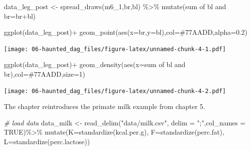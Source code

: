 \documentclass[
]{book}
\newenvironment{Shaded}{\begin{snugshade}}{\end{snugshade}}
\newcommand{\AttributeTok}[1]{\textcolor[rgb]{0.77,0.63,0.00}{#1}}
\newcommand{\CommentTok}[1]{\textcolor[rgb]{0.56,0.35,0.01}{\textit{#1}}}
\newcommand{\ConstantTok}[1]{\textcolor[rgb]{0.00,0.00,0.00}{#1}}
\newcommand{\DecValTok}[1]{\textcolor[rgb]{0.00,0.00,0.81}{#1}}
\newcommand{\FloatTok}[1]{\textcolor[rgb]{0.00,0.00,0.81}{#1}}
\newcommand{\FunctionTok}[1]{\textcolor[rgb]{0.00,0.00,0.00}{#1}}
\newcommand{\NormalTok}[1]{#1}
\newcommand{\OtherTok}[1]{\textcolor[rgb]{0.56,0.35,0.01}{#1}}
\newcommand{\SpecialCharTok}[1]{\textcolor[rgb]{0.00,0.00,0.00}{#1}}
\newcommand{\StringTok}[1]{\textcolor[rgb]{0.31,0.60,0.02}{#1}}
\begin{document}
\begin{Shaded}
\begin{Highlighting}[]
\NormalTok{data\_leg\_post }\OtherTok{\textless{}{-}} \FunctionTok{spread\_draws}\NormalTok{(m6\_1,br,bl) }\SpecialCharTok{\%\textgreater{}\%}
  \FunctionTok{mutate}\NormalTok{(}\StringTok{\textasciigrave{}}\AttributeTok{sum of bl and br}\StringTok{\textasciigrave{}}\OtherTok{=}\NormalTok{br}\SpecialCharTok{+}\NormalTok{bl)}

\FunctionTok{ggplot}\NormalTok{(data\_leg\_post)}\SpecialCharTok{+}
  \FunctionTok{geom\_point}\NormalTok{(}\FunctionTok{aes}\NormalTok{(}\AttributeTok{x=}\NormalTok{br,}\AttributeTok{y=}\NormalTok{bl),}\AttributeTok{col=}\StringTok{\textquotesingle{}\#77AADD\textquotesingle{}}\NormalTok{,}\AttributeTok{alpha=}\FloatTok{0.2}\NormalTok{)}
\end{Highlighting}
\end{Shaded}

\texttt{[image: 06-haunted\_dag\_files/figure-latex/unnamed-chunk-4-1.pdf]}

\begin{Shaded}
\begin{Highlighting}[]
\FunctionTok{ggplot}\NormalTok{(data\_leg\_post)}\SpecialCharTok{+}
  \FunctionTok{geom\_density}\NormalTok{(}\FunctionTok{aes}\NormalTok{(}\AttributeTok{x=}\StringTok{\textasciigrave{}}\AttributeTok{sum of bl and br}\StringTok{\textasciigrave{}}\NormalTok{),}\AttributeTok{col=}\StringTok{\textquotesingle{}\#77AADD\textquotesingle{}}\NormalTok{,}\AttributeTok{size=}\DecValTok{1}\NormalTok{)}
\end{Highlighting}
\end{Shaded}

\texttt{[image: 06-haunted\_dag\_files/figure-latex/unnamed-chunk-4-2.pdf]}

The chapter reintroduces the primate milk example from chapter 5.

\begin{Shaded}
\begin{Highlighting}[]
\CommentTok{\# load data}
\NormalTok{data\_milk }\OtherTok{\textless{}{-}} \FunctionTok{read\_delim}\NormalTok{(}\StringTok{"data/milk.csv"}\NormalTok{, }\AttributeTok{delim =} \StringTok{";"}\NormalTok{,}\AttributeTok{col\_names =} \ConstantTok{TRUE}\NormalTok{)}\SpecialCharTok{\%\textgreater{}\%}
  \FunctionTok{mutate}\NormalTok{(}\AttributeTok{K=}\FunctionTok{standardize}\NormalTok{(kcal.per.g),}
         \AttributeTok{F=}\FunctionTok{standardize}\NormalTok{(perc.fat),}
         \AttributeTok{L=}\FunctionTok{standardize}\NormalTok{(perc.lactose))}
\end{Highlighting}
\end{Shaded}
\end{document}
